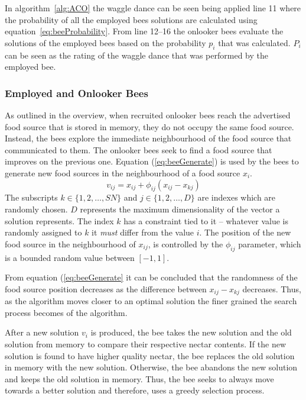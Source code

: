 In algorithm~\ref{alg:ACO} the waggle dance can be seen being applied line 11 where the probability of all the employed bees solutions are calculated using equation~\ref{eq:beeProbability}. From line 12--16 the onlooker bees evaluate the solutions of the employed bees based on the probability $p_i$ that was calculated. $P_i$ can be seen as the rating of the waggle dance that was performed by the employed bee.

\subsubsection{Employed and Onlooker Bees}
\label{sec:employonlookerbees}
As outlined in the overview, when recruited onlooker bees reach the advertised food source that is stored in memory, they do not occupy the same food source\cite{ABCCompareStudy,ABCNumericalOptimization}. Instead, the bees explore the immediate neighbourhood of the food source that communicated to them\cite{BeeJobShop,ABCFusionGrid,ABCReconfigDistro}. The onlooker bees seek to find a food source that improves on the previous one\cite{BeeJobShop,ABCCompareStudy,ABCLeafConstrained,ABCNumericalOptimization}. Equation (\ref{eq:beeGenerate}) is used by the bees to generate new food sources in the neighbourhood of a food source $x_i$\cite{BeeJobShop,ABCCompareStudy,ABCFusionGrid}.
\begin{equation}
\label{eq:beeGenerate}
v_{ij} = x_{ij} + \phi_{ij}(x_{ij} - x_{kj})
\end{equation}
The subscripts $k \in \{1,2,\dots,SN\}$ and $j \in \{1,2,\dots,D\}$ are indexes which are randomly chosen. $D$ represents the maximum dimensionality of the vector a solution represents. The index $k$ has a constraint tied to it -- whatever value is randomly assigned to $k$ it \emph{must} differ from the value $i$. The position of the new food source in the neighbourhood of $x_{ij}$, is controlled by the $\phi_{ij}$ parameter, which is a bounded random value between $[-1,1]$. 

From equation (\ref{eq:beeGenerate} it can be concluded that the randomness of the food source position decreases as the difference between $x_{ij} - x_{kj}$ decreases. Thus, as the algorithm moves closer to an optimal solution the finer grained the search process becomes of the algorithm\cite{ABCCompareStudy,ABCNumericalOptimization,ABCImageEnhancement}.

After a new solution $v_i$ is produced, the bee takes the new solution and the old solution from memory to compare their respective nectar contents. If the new solution is found to have higher quality nectar, the bee replaces the old solution in memory with the new solution\cite{ABCCompareStudy,BeeJobShop,ABCImageEnhancement,ABCReconfigDistro}. Otherwise, the bee abandons the new solution and keeps the old solution in memory\cite{ABCCompareStudy,ABCLeafConstrained,ABCNumericalOptimization}. Thus, the bee seeks to always move towards a better solution and therefore, uses a greedy selection process\cite{ABCCompareStudy,ABCLeafConstrained,ABCReconfigDistro}.


